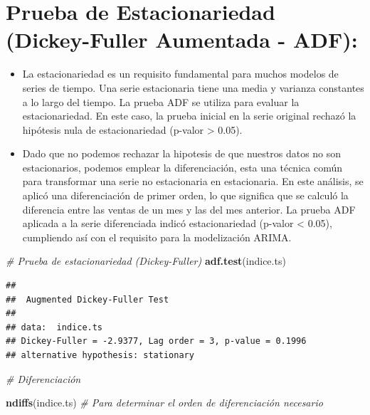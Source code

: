 \documentclass[
]{book}
\newenvironment{Shaded}{\begin{snugshade}}{\end{snugshade}}
\newcommand{\CommentTok}[1]{\textcolor[rgb]{0.56,0.35,0.01}{\textit{#1}}}
\newcommand{\FunctionTok}[1]{\textcolor[rgb]{0.13,0.29,0.53}{\textbf{#1}}}
\newcommand{\NormalTok}[1]{#1}
\begin{document}
\section{Prueba de Estacionariedad (Dickey-Fuller Aumentada - ADF):}\label{prueba-de-estacionariedad-dickey-fuller-aumentada---adf}

\begin{itemize}
\item
  La estacionariedad es un requisito fundamental para muchos modelos de series de tiempo. Una serie estacionaria tiene una media y varianza constantes a lo largo del tiempo. La prueba ADF se utiliza para evaluar la estacionariedad. En este caso, la prueba inicial en la serie original rechazó la hipótesis nula de estacionariedad (p-valor \textgreater{} 0.05).
\item
  Dado que no podemos rechazar la hipotesis de que nuestros datos no son estacionarios, podemos emplear la diferenciación, esta una técnica común para transformar una serie no estacionaria en estacionaria. En este análisis, se aplicó una diferenciación de primer orden, lo que significa que se calculó la diferencia entre las ventas de un mes y las del mes anterior. La prueba ADF aplicada a la serie diferenciada indicó estacionariedad (p-valor \textless{} 0.05), cumpliendo así con el requisito para la modelización ARIMA.
\end{itemize}

\begin{Shaded}
\begin{Highlighting}[]
\CommentTok{\# Prueba de estacionariedad (Dickey{-}Fuller)}
\FunctionTok{adf.test}\NormalTok{(indice.ts)}
\end{Highlighting}
\end{Shaded}

\begin{verbatim}
## 
##  Augmented Dickey-Fuller Test
## 
## data:  indice.ts
## Dickey-Fuller = -2.9377, Lag order = 3, p-value = 0.1996
## alternative hypothesis: stationary
\end{verbatim}

\begin{Shaded}
\begin{Highlighting}[]
\CommentTok{\# Diferenciación}

\FunctionTok{ndiffs}\NormalTok{(indice.ts) }\CommentTok{\# Para determinar el orden de diferenciación necesario}
\end{Highlighting}
\end{Shaded}
\end{document}
